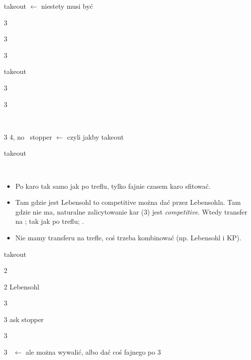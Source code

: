 \documentclass[12pt, a4paper]{article}
\begin{document}
\sequence{{1\clubs}{(3\clubs)}}
\begin{options}[1]
    \item[\dbl] takeout \gf $\leftarrow$ niestety musi być \gf
    \item[3\diams] \then\ \hearts\ \invp
    \item[3\hearts] \then\ \spades\ \invp
    \item[3\spades] \then\ \diams\ \gf
\end{options}

\sequence{{1\clubs}{(3\diams)}}
\begin{options}[1]
    \item[\dbl] takeout \gf
    \item[3\hearts] \then\ \spades\ \invp
    \item[3\spades] \then\ \hearts\ \gf
\end{options}

\sequence{{1\clubs}{(3\hearts)}}
\begin{options}[1]
    \item[\dbl] \spades\ \invp \imp
    \item[3\spades] 4\spades, no \hearts\ stopper \gf $\leftarrow$ czyli jakby takeout
\end{options}

\sequence{{1\clubs}{(3\spades)}}
\begin{options}[1]
    \item[\dbl] takeout \gf
\end{options}

\newpage
{\Huge{\diams}}\\
\begin{itemize}
    \item Po karo tak samo jak po treflu, tylko fajnie czasem karo
    sfitować. 
    \item Tam gdzie jest Lebensohl to \diams competitive można dać przez Lebensohla.
    Tam gdzie nie ma, naturalne zalicytowanie kar (3\diams) jest \textit{competitive}.
    Wtedy transfer na \diams; tak jak po treflu; \invp.
    \item Nie mamy transferu na trefle, coś trzeba kombinować (np. Lebensohl i KP).
\end{itemize}

\sequence{{1\diams}{(2\hearts)}}
\begin{options}[1]
    \item[\dbl] takeout
    \item[2\spades] \nat\ \nf
    \item[2\nt] Lebensohl
    \item[3\clubs] \then\ \diams\ \invp
    \item[3\diams] ask \hearts stopper \gf
    \item[3\hearts] \then\ \spades\ \invp
    \item[3\spades] \then\ \nt $\leftarrow$ ale można wywalić, albo dać coś fajnego po 3\nt
\end{options}
\end{document}
